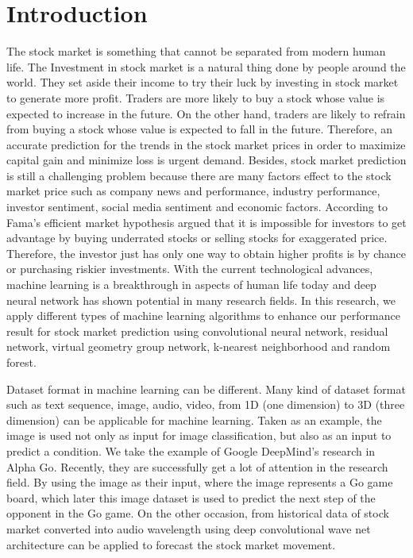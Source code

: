 \documentclass[12pt]{article}
\begin{document}
\section{Introduction}
The stock market is something that cannot be separated from modern human life. The Investment in stock market is a natural thing done by people around the world. They set aside their income to try their luck by investing in stock market to generate more profit. Traders are more likely to buy a stock whose value is expected to increase in the future. On the other hand, traders are likely to refrain from buying a stock whose value is expected to fall in the future. Therefore, an accurate prediction for the trends in the stock market prices in order to maximize capital gain and minimize loss is urgent demand. Besides, stock market prediction is still a challenging problem because there are many factors effect to the stock market price such as company news and performance, industry performance, investor sentiment, social media sentiment and economic factors. According to Fama's efficient market hypothesis argued that it is impossible for investors to get advantage by buying underrated stocks or selling stocks for exaggerated price\cite{malkiel1970efficient}. Therefore, the investor just has only one way to obtain higher profits is by chance or purchasing riskier investments. With the current technological advances, machine learning is a breakthrough in aspects of human life today and deep neural network has shown potential in many research fields. In this research, we apply different types of machine learning algorithms to enhance our performance result for stock market prediction using convolutional neural network, residual network, virtual geometry group network, k-nearest neighborhood and random forest.

Dataset format in machine learning can be different. Many kind of dataset format such as text sequence, image, audio, video, from 1D (one dimension) to 3D (three dimension) can be applicable for machine learning. Taken as an example, the image is used not only as input for image classification, but also as an input to predict a condition. We take the example of Google DeepMind's research in Alpha Go\cite{he2016deep}. Recently, they are successfully get a lot of attention in the research field. By using the image as their input, where the image represents a Go game board, which later this image dataset is used to predict the next step of the opponent in the Go game. On the other occasion, from historical data of stock market converted into audio wavelength using deep convolutional wave net architecture can be applied to forecast the stock market movement\cite{borovykhdilated}.
\end{document}
